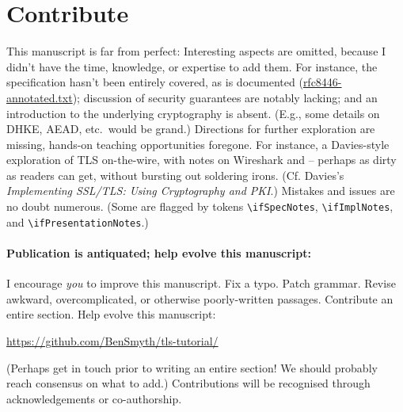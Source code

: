 \section*{Contribute}

This manuscript is far from perfect: 
%
Interesting aspects are omitted, because I %
didn't have the time, knowledge, or expertise to add them. For instance, the specification 
hasn't been entirely covered, as is documented 
(\href{https://github.com/BenSmyth/tls-tutorial/blob/master/rfc8446-annotated.txt}{rfc8446-annotated.txt}); 
discussion of security guarantees are notably lacking; and an introduction to the underlying 
cryptography is absent. (E.g., some details on DHKE, AEAD, etc.\ would be grand.) 
%
Directions for further exploration are missing, hands-on teaching opportunities foregone. For 
instance, a Davies-style exploration of TLS on-the-wire, with notes on Wireshark and 
 -- perhaps as dirty as readers can get, without bursting out soldering 
irons. (Cf. Davies's \emph{Implementing SSL/TLS: Using Cryptography and PKI}.)
%
Mistakes and issues are no doubt numerous. (Some are flagged by tokens \texttt{\textbackslash{}ifSpecNotes}, 
\texttt{\textbackslash{}ifImplNotes}, and \texttt{\textbackslash{}ifPresentationNotes}.)


\paragraph{Publication is antiquated; help evolve this manuscript:}
I %
encourage \emph{you} to improve this manuscript. Fix a typo. Patch grammar.
Revise awkward, overcomplicated, or otherwise poorly-written passages. 
Contribute an entire section. Help evolve this manuscript:
%
\begin{center}
  \url{https://github.com/BenSmyth/tls-tutorial/}
\end{center}
%
(Perhaps get in touch prior to writing an entire section! We should probably reach consensus 
on what to add.) Contributions will be recognised through acknowledgements or co-authorship.


